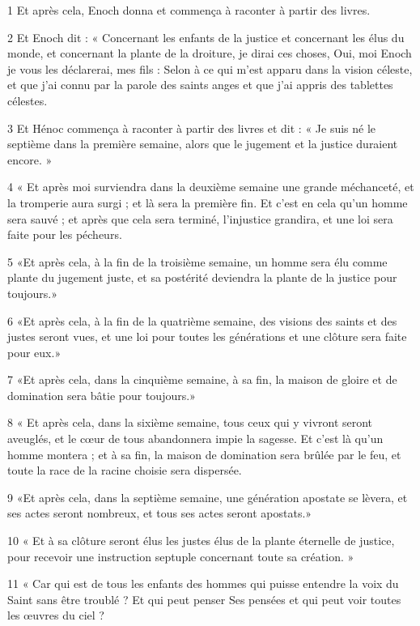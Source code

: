 
\par 1 Et après cela, Enoch donna et commença à raconter à partir des livres.
\par 2 Et Enoch dit : « Concernant les enfants de la justice et concernant les élus du monde, et concernant la plante de la droiture, je dirai ces choses, Oui, moi Enoch je vous les déclarerai, mes fils : Selon à ce qui m'est apparu dans la vision céleste, et que j'ai connu par la parole des saints anges et que j'ai appris des tablettes célestes.
\par 3 Et Hénoc commença à raconter à partir des livres et dit : « Je suis né le septième dans la première semaine, alors que le jugement et la justice duraient encore. »
\par 4 « Et après moi surviendra dans la deuxième semaine une grande méchanceté, et la tromperie aura surgi ; et là sera la première fin. Et c'est en cela qu'un homme sera sauvé ; et après que cela sera terminé, l'injustice grandira, et une loi sera faite pour les pécheurs.
\par 5 «Et après cela, à la fin de la troisième semaine, un homme sera élu comme plante du jugement juste, et sa postérité deviendra la plante de la justice pour toujours.»
\par 6 «Et après cela, à la fin de la quatrième semaine, des visions des saints et des justes seront vues, et une loi pour toutes les générations et une clôture sera faite pour eux.»
\par 7 «Et après cela, dans la cinquième semaine, à sa fin, la maison de gloire et de domination sera bâtie pour toujours.»
\par 8 « Et après cela, dans la sixième semaine, tous ceux qui y vivront seront aveuglés, et le cœur de tous abandonnera impie la sagesse. Et c'est là qu'un homme montera ; et à sa fin, la maison de domination sera brûlée par le feu, et toute la race de la racine choisie sera dispersée.
\par 9 «Et après cela, dans la septième semaine, une génération apostate se lèvera, et ses actes seront nombreux, et tous ses actes seront apostats.»
\par 10 « Et à sa clôture seront élus les justes élus de la plante éternelle de justice, pour recevoir une instruction septuple concernant toute sa création. »
\par 11 « Car qui est de tous les enfants des hommes qui puisse entendre la voix du Saint sans être troublé ? Et qui peut penser Ses pensées et qui peut voir toutes les œuvres du ciel ?
